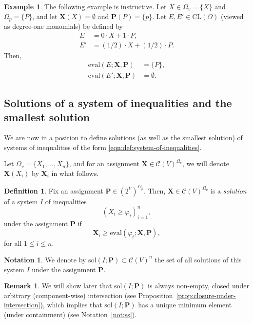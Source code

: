 \documentclass[10pt]{amsart}
\theoremstyle{plain}
\theoremstyle{definition}
\newtheorem{definition}[lemma]{Definition}
\newtheorem{example}[lemma]{Example}
\newtheorem{notation}[lemma]{Notation}
\newtheorem{remark}[lemma]{Remark}
\providecommand{\cC}[0]{\ensuremath{\mathcal C}\xspace}
\providecommand{\bP}[0]{\ensuremath{\mathbf P}\xspace}
\providecommand{\bX}[0]{\ensuremath{\mathbf X}\xspace}
\let\leq\leqslant
\let\geq\geqslant
\providecommand{\CL}[0]{\ensuremath{\mathrm{CL}}\xspace}
\providecommand{\convset}[0]{\ensuremath{\cC}\xspace}
\providecommand{\sol}{\ensuremath{\mathrm{sol}}\xspace}
\providecommand{\evalmap}[0]{\ensuremath{\mathrm{eval}}\xspace}
\begin{document}
\begin{example}
    The following example is instructive. Let $X \in \Omega_v = \{X\}$ and $\Omega_p = \{P\}$, 
    and let $\bX(X) = \emptyset$ and $\bP(P) = \{p\}$. 
    Let  $E,E' \in \CL(\Omega)$ (viewed as degree-one monomials)
    be defined by 
    \begin{align*}
        E &= 0 \cdot X + 1 \cdot P, \\
        E' &= (1/2) \cdot X + (1/2) \cdot P.
    \end{align*}
    Then, 
    \begin{align*}
    \evalmap(E;\bX,\bP) &= \{P\}, \\
    \evalmap(E';\bX,\bP) &= \emptyset.
    \end{align*}
\end{example}

\subsection{Solutions of a system of inequalities and the smallest solution}
\label{subsec:solutions}
We are now in a position to define solutions (as well as the smallest solution) of systems of inequalities of the form \eqref{eqn:def:system-of-inequalities}.

Let $\Omega_v = \{X_1,\ldots,X_n\}$, and for an assignment
$\bX \in \convset(V)^{\Omega_v}$, 
we will denote $\bX(X_i)$ by $\bX_i$ in what follows.
\begin{definition}
\label{def:sol}
Fix an assignment $\bP \in (2^V)^{\Omega_p}$.
Then, 
$\bX 
\in\convset(V)^{\Omega_v}
$ 
is a {\em solution} of a system $I$ of inequalities 
\[
\left(X_i\geq \varphi_i\right)_{i=1}^n,
\]
under the assignment $\bP$
if 
\[
\bX_i\geq \evalmap(\varphi_i;\bX,\bP),
\]
for all $1 \leq i \leq n$. 
\end{definition}

\begin{notation}
\label{not:sol}
We denote by  $\sol(I;\bP)\subset \convset(V)^n$ the set of all solutions of this system $I$ under the assignment $\bP$.
\end{notation}

\begin{remark}
\label{rem:ss}
We will show later that $\sol(I;\bP)$ is always non-empty,
closed under arbitrary (component-wise) intersection (see Proposition~\ref{prop:closure-under-intersection}),
which implies that $\sol(I;\bP)$ has a unique minimum element
(under containment) (see Notation~\ref{not:ss}).
\end{remark}
\end{document}
